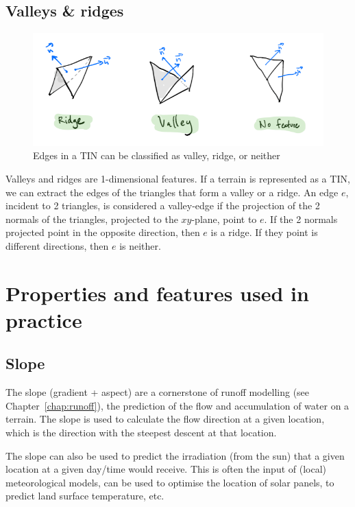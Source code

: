 \subsection{Valleys \& ridges}

\begin{figure}
  \centering
  \includegraphics[width=\linewidth]{figs/valley_ridge}
  \caption{Edges in a TIN can be classified as valley, ridge, or neither}%
\label{fig:valley_ridge}
\end{figure}
Valleys and ridges are 1-dimensional features.
If a terrain is represented as a TIN, we can extract the edges of the triangles that form a valley or a ridge.
An edge $e$, incident to 2 triangles, is considered a valley-edge if the projection of the 2 normals of the triangles, projected to the $xy$-plane, point to $e$.
If the 2 normals projected point in the opposite direction, then $e$ is a ridge.
If they point is different directions, then $e$ is neither.






%
\section[Properties used in practice]{Properties and features used in practice}


\subsection{Slope}%

The slope (gradient + aspect) are a cornerstone of runoff modelling (see Chapter~\ref{chap:runoff}), the prediction of the flow and accumulation of water on a terrain.
The slope is used to calculate the flow direction at a given location, which is the direction with the steepest descent at that location.

%

The slope can also be used to predict the irradiation (from the sun) that a given location at a given day/time would receive.
This is often the input of (local) meteorological models, can be used to optimise the location of solar panels, to predict land surface temperature, etc.


